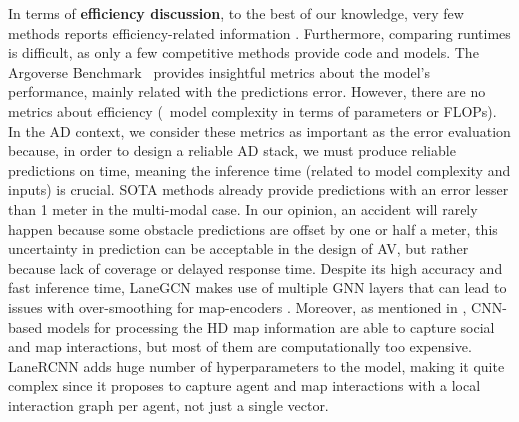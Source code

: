 In terms of \textbf{efficiency discussion}, to the best of our knowledge, very few methods reports efficiency-related information \cite{gilles2022gohome, gilles2021home, liu2021multimodal, gao2020vectornet}. Furthermore, comparing runtimes is difficult, as only a few competitive methods provide code and models. The Argoverse Benchmark~\cite{chang2019argoverse} provides insightful metrics about the model's performance, mainly related with the predictions error. However, there are no metrics about efficiency (\ie \ model complexity in terms of parameters or FLOPs). In the AD context, we consider these metrics as important as the error evaluation because, in order to design a reliable AD stack, we must produce reliable predictions on time, meaning the inference time (related to model complexity and inputs) is crucial. SOTA methods already provide predictions with an error lesser than 1 meter in the multi-modal case. In our opinion, an accident will rarely happen because some obstacle predictions are offset by one or half a meter, this uncertainty in prediction can be acceptable in the design of AV, but rather because lack of coverage or delayed response time. Despite its high accuracy and fast inference time, LaneGCN \cite{liang2020learning} makes use of multiple GNN layers that can lead to issues with over-smoothing for map-encoders \cite{li2018deeper}. Moreover, as mentioned in \cite{gao2020vectornet}, CNN-based models for processing the HD map information are able to capture social and map interactions, but most of them are computationally too expensive. LaneRCNN \cite{zeng2021lanercnn} adds huge number of hyperparameters to the model, making it quite complex since it proposes to capture agent and map interactions with a local interaction graph per agent, not just a single vector. 

